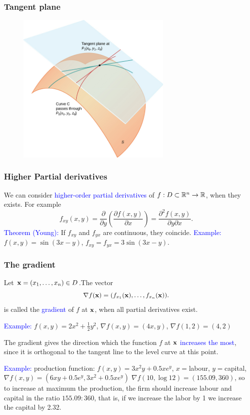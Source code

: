\documentclass[11pt,aspectratio=169]{beamer}
\begin{document}
\begin{frame}
\frametitle{Tangent plane}
\begin{figure}
\includegraphics[width=3in]{img/tp.jpg} 
\end{figure}
\end{frame}




\begin{frame}
\frametitle{Higher Partial derivatives}
\begin{small}
We can consider \textcolor{blue}{higher-order partial derivatives} of $f:D \subset \mathbb R^n \rightarrow \mathbb R$, when they exists. For example
$$
f_{xy}(x,y)=\frac{\partial}{\partial y} \left( \frac{\partial f(x,y)}{\partial x}\right)=
\frac{\partial^2 f(x,y)}{\partial y \partial x}.
$$ 
\vskip 12pt
 \textcolor{blue}{Theorem (Young):} If $f_{xy}$ and $f_{yx}$ are continuous, they coincide.
\vskip 12pt
 \textcolor{blue}{Example:} $f(x,y)=\sin(3x-y)$, $f_{xy}=f_{yx}=3 \sin(3x-y)$.


\end{small}
\end{frame}
\begin{frame}
\frametitle{The gradient}
\begin{small}
Let ${\bf x}=(x_1,\ldots,x_n) \in D$.The vector
$$
\nabla f({\bf x})=(f_{x_1}({\bf x}),\dots,f_{x_n}({\bf x})).
$$
is called the \textcolor{blue}{gradient} of $f$ at ${\bf x}$, when all partial derivatives exist.
\vskip 10pt

 \textcolor{blue}{Example:} $f(x,y)=2x^2+\frac12 y^2$, $\nabla f(x,y)=(4x, y)$, 
$\nabla f(1,2)=(4, 2)$ 

\vskip 10pt
 The gradient gives the direction which the function $f$ at ${\bf x}$ \textcolor{blue}{increases the most}, since it is orthogonal to the tangent line to the level curve at this point.
\vskip 10pt

 \textcolor{blue}{Example:} production function: $f(x,y)=3x^2y+0.5 x e^y$, $x=$labour, $y=$capital,
$\nabla f(x,y)=(6xy+0.5 e^y, 3x^2+0.5xe^y)$
\vskip 10pt
$\nabla f(10,\log 12)=(155.09, 360)$, so to increase at maximum the production, the firm should increase labour and capital in the ratio $155.09:360$, that is, if we increase the labor by 1 we increase the capital by 2.32.


\end{small}
\end{frame}
\end{document}
